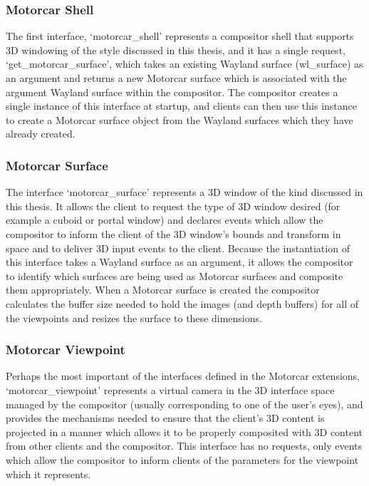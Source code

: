 \subsubsection{Motorcar Shell}

The first interface, `motorcar{\_}shell' represents a compositor shell that supports 3D windowing of the style discussed in this thesis, and  it has a single request, `get{\_}motorcar{\_}surface', which takes an existing Wayland surface (wl{\_}surface) as an argument and returns a new Motorcar surface which is associated with the argument Wayland surface within the compositor.  The compositor creates a single instance of this interface at startup, and clients can then use this instance to create a Motorcar surface object from the Wayland surfaces which they have already created.

\subsubsection{Motorcar Surface}

The interface `motorcar{\_}surface' represents a 3D window of the kind discussed in this thesis. It allows the client to request the type of 3D window desired (for example a cuboid or portal window) and declares events which allow the compositor to inform the client of the 3D window's bounds and transform in space and to deliver 3D input events to the client. Because the instantiation of this interface takes a Wayland surface as an argument, it allows the compositor to identify which surfaces are being used as Motorcar surfaces and composite them appropriately. When a Motorcar surface is created the compositor calculates the buffer size needed to hold the images (and depth buffers) for all of the viewpoints and resizes the surface to these dimensions.

\subsubsection{Motorcar Viewpoint}
\label{sec:viewpoint}

Perhaps the most important of the interfaces defined in the Motorcar extensions, `motorcar{\_}viewpoint' represents a virtual camera in the 3D interface space managed by the compositor (usually corresponding to one of the user's eyes), and provides the mechanisms needed to ensure that the client's 3D content is projected in a manner which allows it to be properly composited with 3D content from other clients and the compositor. This interface has no requests, only events which allow the compositor to inform clients of the parameters for the viewpoint which it represents.

